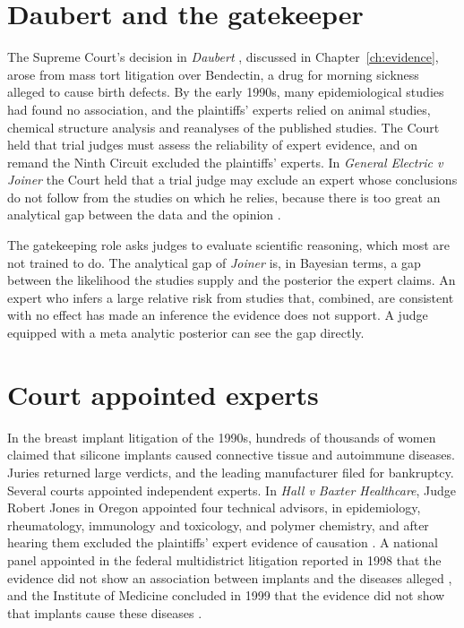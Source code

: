 \section{Daubert and the gatekeeper}

The Supreme Court's decision in \emph{Daubert} \citep{daubert1993}, discussed in Chapter~\ref{ch:evidence}, arose from mass tort litigation over Bendectin, a drug for morning sickness alleged to cause birth defects. By the early 1990s, many epidemiological studies had found no association, and the plaintiffs' experts relied on animal studies, chemical structure analysis and reanalyses of the published studies. The Court held that trial judges must assess the reliability of expert evidence, and on remand the Ninth Circuit excluded the plaintiffs' experts. In \emph{General Electric v Joiner} the Court held that a trial judge may exclude an expert whose conclusions do not follow from the studies on which he relies, because there is too great an analytical gap between the data and the opinion \citep{joiner1997}.

The gatekeeping role asks judges to evaluate scientific reasoning, which most are not trained to do. The analytical gap of \emph{Joiner} is, in Bayesian terms, a gap between the likelihood the studies supply and the posterior the expert claims. An expert who infers a large relative risk from studies that, combined, are consistent with no effect has made an inference the evidence does not support. A judge equipped with a meta analytic posterior can see the gap directly.

\section{Court appointed experts}

In the breast implant litigation of the 1990s, hundreds of thousands of women claimed that silicone implants caused connective tissue and autoimmune diseases. Juries returned large verdicts, and the leading manufacturer filed for bankruptcy. Several courts appointed independent experts. In \emph{Hall v Baxter Healthcare}, Judge Robert Jones in Oregon appointed four technical advisors, in epidemiology, rheumatology, immunology and toxicology, and polymer chemistry, and after hearing them excluded the plaintiffs' expert evidence of causation \citep{hall1996}. A national panel appointed in the federal multidistrict litigation reported in 1998 that the evidence did not show an association between implants and the diseases alleged \citep{nationalsciencepanel1998}, and the Institute of Medicine concluded in 1999 that the evidence did not show that implants cause these diseases \citep{iom1999}.

